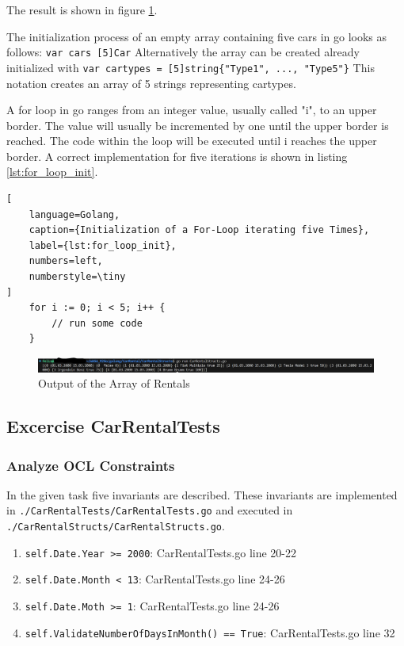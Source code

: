 The result is shown in figure \ref{fig:car_rental_array_five_rentals}.

The initialization process of an empty array containing five cars in go looks as follows: \texttt{var cars [5]Car}
Alternatively the array can be created already initialized with \texttt{var cartypes = [5]string\{"Type1", ..., "Type5"\}}
This notation creates an array of 5 strings representing cartypes.

A for loop in go ranges from an integer value, usually called "i", to an upper border.
The value will usually be incremented by one until the upper border is reached. 
The code within the loop will be executed until i reaches the upper border.
A correct implementation for five iterations is shown in listing \ref{lst:for_loop_init}.

\begin{lstlisting}[
    language=Golang,
    caption={Initialization of a For-Loop iterating five Times},
    label={lst:for_loop_init},
    numbers=left,
    numberstyle=\tiny
]
    for i := 0; i < 5; i++ {
        // run some code
    }
\end{lstlisting}

\begin{figure}[H]
    \centering
    \includegraphics[width=\textwidth]{figures/goLang/carRental/carRental_arrayFiveRentals.png}
    \caption{Output of the Array of Rentals}
    \label{fig:car_rental_array_five_rentals}
\end{figure}

\subsection{Excercise CarRentalTests}
\label{sec:car_rental_tests}
\subsubsection*{Analyze OCL Constraints}
In the given task five invariants are described.
These invariants are implemented in \texttt{./CarRentalTests/CarRentalTests.go} and executed in \texttt{./CarRentalStructs/CarRentalStructs.go}.
\begin{enumerate}
    \item \texttt{self.Date.Year >= 2000}: CarRentalTests.go line 20-22
    \item \texttt{self.Date.Month < 13}: CarRentalTests.go line 24-26
    \item \texttt{self.Date.Moth >= 1}: CarRentalTests.go line 24-26
    \item \texttt{self.ValidateNumberOfDaysInMonth() == True}: CarRentalTests.go line 32
\end{enumerate}

